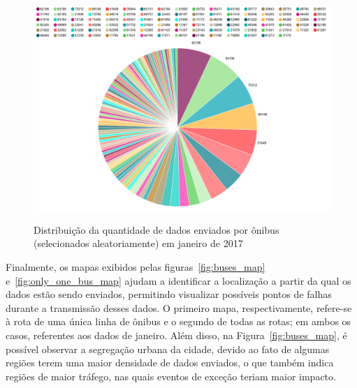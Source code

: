 \documentclass[
	12pt,				%
	oneside,			%
	a4paper,			%
	english,			%
	brazil				%
	]{abntex2ppgsi}
\begin{document}
{{\begin{figure}[!htb]%
	\centering
 	  \caption{Distribuição da quantidade de dados enviados por ônibus (selecionados aleatoriamente) em janeiro de 2017}
		\includegraphics[width=1\linewidth]{images/pizza_bus.png}
	\label{fig:pizza_bus}
\end{figure}

Finalmente, os mapas exibidos pelas figuras~\ref {fig:buses_map} e~\ref{fig:only_one_bus_map} ajudam a identificar a localização a partir da qual os dados estão sendo enviados, permitindo visualizar possíveis pontos de falhas durante a transmissão desses dados. O primeiro mapa, respectivamente, refere-se à rota de uma única linha de ônibus e o segundo de todas as rotas; em ambos os casos, referentes aos dados de janeiro. Além disso, na Figura~\ref {fig:buses_map}, é possível observar a segregação urbana da cidade, devido ao fato de algumas regiões terem uma maior densidade de dados enviados, o que também indica regiões de maior tráfego, nas quais eventos de exceção teriam maior impacto.

}}
\end{document}
